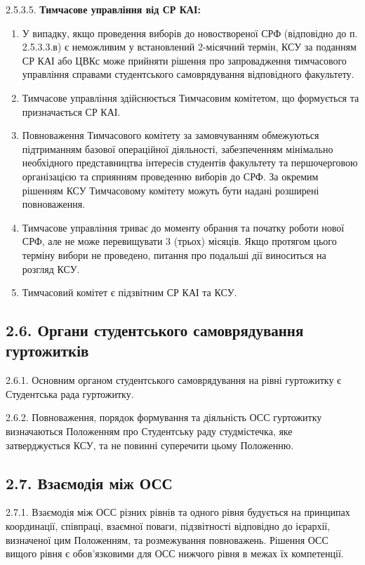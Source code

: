         2.5.3.5. \textbf{Тимчасове управління від СР КАІ:}
            \begin{enumerate}[label=\alph*)]
                \item У випадку, якщо проведення виборів до новоствореної СРФ (відповідно до п. 2.5.3.3.в) є неможливим у встановлений 2-місячний термін, КСУ за поданням СР КАІ або ЦВКс може прийняти рішення про запровадження тимчасового управління справами студентського самоврядування відповідного факультету.
                \item Тимчасове управління здійснюється Тимчасовим комітетом, що формується та призначається СР КАІ.
                \item Повноваження Тимчасового комітету за замовчуванням обмежуються підтриманням базової операційної діяльності, забезпеченням мінімально необхідного представництва інтересів студентів факультету та першочерговою організацією та сприянням проведенню виборів до СРФ. За окремим рішенням КСУ Тимчасовому комітету можуть бути надані розширені повноваження.
                \item Тимчасове управління триває до моменту обрання та початку роботи нової СРФ, але не може перевищувати 3 (трьох) місяців. Якщо протягом цього терміну вибори не проведено, питання про подальші дії виноситься на розгляд КСУ.
                \item Тимчасовий комітет є підзвітним СР КАІ та КСУ.
            \end{enumerate}

\subsection*{2.6. Органи студентського самоврядування гуртожитків}
    2.6.1. Основним органом студентського самоврядування на рівні гуртожитку є Студентська рада гуртожитку.

    2.6.2. Повноваження, порядок формування та діяльність ОСС гуртожитку визначаються Положенням про Студентську раду студмістечка, яке затверджується КСУ, та не повинні суперечити цьому Положенню.

\subsection*{2.7. Взаємодія між ОСС}
    2.7.1. Взаємодія між ОСС різних рівнів та одного рівня будується на принципах координації, співпраці, взаємної поваги, підзвітності відповідно до ієрархії, визначеної цим Положенням, та розмежування повноважень. Рішення ОСС вищого рівня є обов'язковими для ОСС нижчого рівня в межах їх компетенції.

